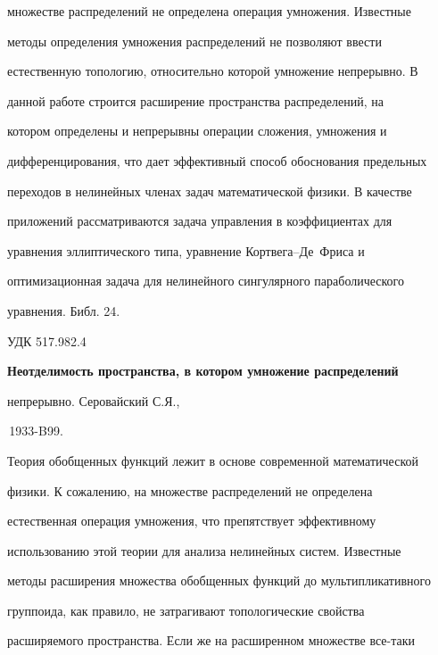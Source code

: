 множестве распределений не определена операция умножения. Известные 


методы определения умножения распределений не позволяют ввести 


естественную топологию, относительно которой умножение непрерывно. В 


данной работе строится расширение пространства распределений, на 


котором определены и непрерывны операции сложения, умножения и 


дифференцирования, что дает эффективный способ обоснования предельных 


переходов в нелинейных членах задач математической физики. В качестве 


приложений рассматриваются задача управления в коэффициентах для 


уравнения эллиптического типа, уравнение Кортвега--Де~Фриса и 


оптимизационная задача для нелинейного сингулярного параболического 


уравнения. Библ. 24. 


\bigskip 


 


 


{\hfill {УДК 517.982.4}} 


 


{\bf Неотделимость пространства, в котором умножение распределений 


непрерывно. Серовайский С.Я., 


\No\,1933-B99.} 


\medskip 


 


Теория обобщенных функций лежит в основе современной математической 


физики. К сожалению, на множестве распределений не определена 


естественная операция умножения, что препятствует эффективному 


использованию этой теории для анализа нелинейных систем. Известные 


методы расширения множества обобщенных функций до мультипликативного 


группоида, как правило, не затрагивают топологические свойства 


расширяемого пространства. Если же на расширенном множестве все-таки 


